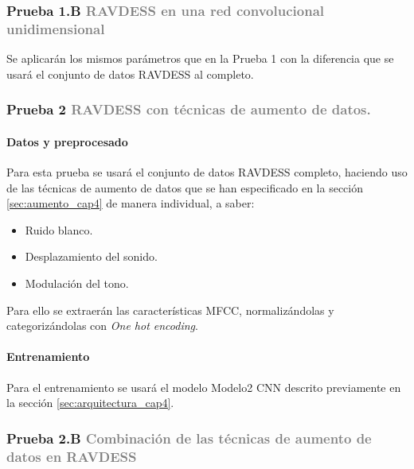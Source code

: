 \documentclass[11pt,a4paper,spanish]{book}
\begin{document}
	\subsubsection[]{\Large Prueba 1.B {\normalsize \textcolor{Gray}{RAVDESS en una red convolucional unidimensional}}}
	Se aplicarán los mismos parámetros que en la Prueba 1 con la diferencia que se usará el conjunto de datos RAVDESS al completo.


	\subsubsection[]{\Large Prueba 2  {\normalsize \textcolor{Gray}{RAVDESS con técnicas de aumento de datos.}}}
	\hfill\begin{minipage}{\dimexpr\textwidth-1cm}
		
		\paragraph{Datos y preprocesado}Para esta prueba se usará el conjunto de datos RAVDESS completo, haciendo uso de las técnicas de aumento de datos que se han especificado en la sección \ref{sec:aumento_cap4} de manera individual, a saber:
		\begin{itemize}
			\item Ruido blanco.
			\item Desplazamiento del sonido.
			\item Modulación del tono.
		\end{itemize}
		Para ello se extraerán las características MFCC, normalizándolas y categorizándolas con \emph{One hot encoding}.
		\paragraph{Entrenamiento}Para el entrenamiento se usará el modelo Modelo2 CNN descrito previamente en la sección \ref{sec:arquitectura_cap4}.
		
	\end{minipage}
	
	
	\subsubsection[]{\Large Prueba 2.B {\normalsize \textcolor{Gray}{Combinación de las técnicas de aumento de datos en RAVDESS}}}
	
\end{document}
